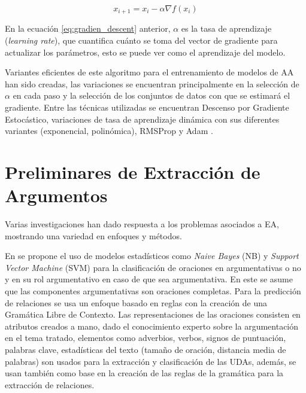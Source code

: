 \documentclass[a4paper,11pt,twocolumn,twoside]{article}
\begin{document}
\begin{equation}
	x_{i+1} = x_i - \alpha \nabla f(x_i)\label{eq:gradien_descent}
\end{equation}

En la ecuación \ref{eq:gradien_descent} anterior, $\alpha$ es la tasa de aprendizaje (\textit{learning rate}),
que cuantifica cuánto se toma del vector de gradiente para actualizar los parámetros, esto 
se puede ver como el aprendizaje del modelo.

Variantes eficientes de este algoritmo para el entrenamiento de modelos de AA han sido 
creadas, las variaciones se encuentran principalmente en la selección de $\alpha$ en cada paso y la 
selección de los conjuntos de datos con que se estimará el gradiente. Entre las técnicas utilizadas se 
encuentran Descenso por Gradiente Estocástico, variaciones de tasa de aprendizaje dinámica con 
sus diferentes variantes (exponencial, polinómica), RMSProp \cite{tieleman2012rmsp}
y Adam \cite{kingma2014adam}.

\section{Preliminares de Extracción de Argumentos}

Varias investigaciones han dado respuesta a los problemas asociados a EA, mostrando
una variedad en enfoques y métodos.

En \cite{palau2009argumentation} se propone
el uso de modelos estadísticos como \textit{Naive Bayes} (NB) y \textit{Support Vector Machine} (SVM)
para la clasificación de 
oraciones en argumentativas o no y en su rol argumentativo en caso de que sea argumentativa. En este
se asume que las componentes argumentativas son oraciones completas. Para la predicción de relaciones
se usa un enfoque basado en reglas con la creación de una Gramática Libre de Contexto. Las representaciones
de las oraciones consisten en atributos creados a mano, dado el conocimiento experto sobre la argumentación
en el tema tratado, elementos como adverbios, verbos, signos de puntuación, palabras clave, estadísticas del texto
(tamaño de oración, distancia media de palabras) son usados para la extracción y clasificación de las UDAs, además,
se usan también como base en la creación de las reglas de la gramática para la extracción de relaciones.
\end{document}

